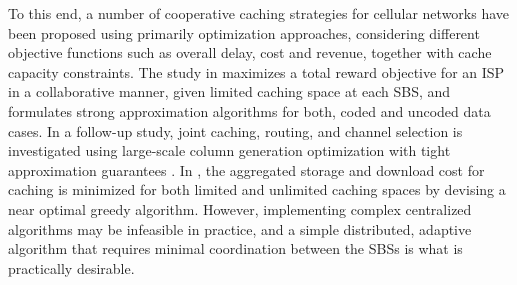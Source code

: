 \documentclass[conference]{IEEEtran}
\begin{document}
To this end, a number of cooperative caching strategies for cellular networks have been proposed using primarily optimization approaches, considering different objective functions such as overall delay, cost and revenue, together with cache capacity constraints. The study in \cite{7179394} maximizes a total reward objective for an ISP in a collaborative manner, given limited caching space at each SBS, and formulates strong approximation algorithms for both, coded and uncoded data cases. In a follow-up study, joint caching, routing, and channel selection is investigated using large-scale column generation optimization with tight approximation guarantees \cite{KhreishahCG:15}. In \cite{7815021}, the aggregated storage and download cost for caching is minimized for both limited and unlimited caching spaces by devising a near optimal greedy algorithm. 
However, 
implementing complex centralized algorithms may be infeasible in practice, and 
a simple distributed, adaptive algorithm that requires minimal coordination between the SBSs is what is practically desirable.
\end{document}
